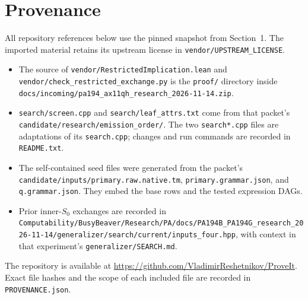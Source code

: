 \documentclass[11pt]{article}
\begin{document}
\section{Provenance}\label{sec:provenance}

All repository references below use the pinned snapshot from Section~1.
The imported material retains its upstream license in
\nolinkurl{vendor/UPSTREAM_LICENSE}.

\begin{itemize}
\item The source of \nolinkurl{vendor/RestrictedImplication.lean} and
\nolinkurl{vendor/check_restricted_exchange.py} is the
\nolinkurl{proof/} directory inside
\nolinkurl{docs/incoming/pa194_ax11qh_research_2026-11-14.zip}.
\item \nolinkurl{search/screen.cpp} and \nolinkurl{search/leaf_attrs.txt}
come from that packet's \nolinkurl{candidate/research/emission_order/}.
The two \texttt{search*.cpp} files are adaptations of its
\texttt{search.cpp}; changes and run commands are recorded in
\texttt{README.txt}.
\item The self-contained seed files were generated from the packet's
\nolinkurl{candidate/inputs/primary.raw.native.tm},
\texttt{primary.grammar.json}, and \texttt{q.grammar.json}.
They embed the base rows and the tested expression DAGs.
\item Prior inner-$S_0$ exchanges are recorded in
\nolinkurl{Computability/BusyBeaver/Research/PA/docs/PA194B_PA194G_research_2026-11-14/generalizer/search/current/inputs_four.hpp},
with context in that experiment's \nolinkurl{generalizer/SEARCH.md}.
\end{itemize}

The repository is available at
\url{https://github.com/VladimirReshetnikov/ProveIt}.
Exact file hashes and the scope of each included file are recorded in
\texttt{PROVENANCE.json}.
\end{document}
